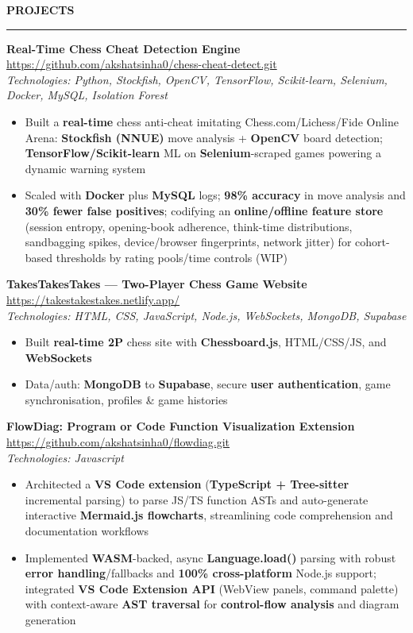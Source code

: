 \documentclass[10pt]{article}
\newcommand{\sectionrule}{\vspace{3pt}\hrule height 0.5pt \vspace{4pt}}
\newcommand{\ressection}[1]{\vspace{1pt}\textbf{#1}\sectionrule}
\begin{document}
\ressection{PROJECTS}
\textbf{Real-Time Chess Cheat Detection Engine} \hfill \href{https://github.com/akshatsinha0/chess-cheat-detect.git}{https://github.com/akshatsinha0/chess-cheat-detect.git}\\
{\small\textcolor{black!70}{\textit{Technologies: Python, Stockfish, OpenCV, TensorFlow, Scikit-learn, Selenium, Docker, MySQL, Isolation Forest}}}\\[-5pt]
\begin{itemize}
  \item Built a \textbf{real-time} chess anti-cheat imitating Chess.com/Lichess/Fide Online Arena: \textbf{Stockfish (NNUE)} move analysis + \textbf{OpenCV} board detection; \textbf{TensorFlow/Scikit-learn} ML on \textbf{Selenium}-scraped games powering a dynamic warning system
  \item Scaled with \textbf{Docker} plus \textbf{MySQL} logs; \textbf{98\% accuracy} in move analysis and \textbf{30\% fewer false positives}; codifying an \textbf{online/offline feature store} (session entropy, opening-book adherence, think-time distributions, sandbagging spikes, device/browser fingerprints, network jitter) for cohort-based thresholds by rating pools/time controls (WIP)
\end{itemize}

\textbf{TakesTakesTakes — Two-Player Chess Game Website} \hfill \href{https://takestakestakes.netlify.app/}{https://takestakestakes.netlify.app/}\\
{\small\textcolor{black!70}{\textit{Technologies: HTML, CSS, JavaScript, Node.js, WebSockets, MongoDB, Supabase}}}\\[-5pt]
\begin{itemize}
  \item Built \textbf{real-time 2P} chess site with \textbf{Chessboard.js}, HTML/CSS/JS, and \textbf{WebSockets}
  \item Data/auth: \textbf{MongoDB} to \textbf{Supabase}, secure \textbf{user authentication}, game synchronisation, profiles \& game histories
\end{itemize}

\textbf{FlowDiag: Program or Code Function Visualization Extension} \hfill \href{https://github.com/akshatsinha0/flowdiag.git}{https://github.com/akshatsinha0/flowdiag.git}\\
{\small\textcolor{black!70}{\textit{Technologies: Javascript}}}\\[-5pt]
\begin{itemize}
  \item Architected a \textbf{VS Code extension} (\textbf{TypeScript + Tree-sitter} incremental parsing) to parse JS/TS function ASTs and auto-generate interactive \textbf{Mermaid.js flowcharts}, streamlining code comprehension and documentation workflows
  \item Implemented \textbf{WASM}-backed, async \textbf{Language.load()} parsing with robust \textbf{error handling}/fallbacks and \textbf{100\% cross-platform} Node.js support; integrated \textbf{VS Code Extension API} (WebView panels, command palette) with context-aware \textbf{AST traversal} for \textbf{control-flow analysis} and diagram generation
\end{itemize}
\end{document}

